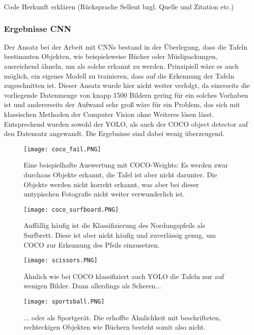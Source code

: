 Code Herkunft erklären (Rücksprache Sellent bzgl. Quelle und Zitation etc.)\\

\subsubsection{Ergebnisse CNN}

Der Ansatz bei der Arbeit mit CNNs bestand in der Überlegung, dass die Tafeln bestimmten Objekten, wie beispielsweise Bücher oder Müslipackungen, ausreichend ähneln, um als solche erkannt zu werden. Prinzipiell wäre es auch möglich, ein eigenes Modell zu trainieren, dass auf die Erkennung der Tafeln zugeschnitten ist. Dieser Ansatz wurde hier nicht weiter verfolgt, da einerseits die vorliegende Datenmenge von knapp 1500 Bildern gering für ein solches Vorhaben ist und andererseits der Aufwand sehr groß wäre für ein Problem, das sich mit klassischen Methoden der Computer Vision ohne Weiteres lösen lässt.\\
Entsprechend wurden sowohl der YOLO, als auch der COCO object detector auf den Datensatz angewandt. Die Ergebnisse sind dabei wenig überzeugend.

\begin{SCfigure}[1][h!]
\caption{Eine beispielhafte Auswertung mit COCO-Weights: Es werden zwar durchaus Objekte erkannt, die Tafel ist aber nicht darunter. Die Objekte werden nicht korrekt erkannt, was aber bei dieser untypischen Fotografie nicht weiter verwunderlich ist.}
\texttt{[image: coco\_fail.PNG]}
\end{SCfigure}

\begin{SCfigure}[1][h!]
\caption{Auffällig häufig ist die Klassifizierung des Nordungspfeils als Surfbrett. Diese ist aber nicht häufig und zuverlässig genug, um COCO zur Erkennung des Pfeils einzusetzen.}
\texttt{[image: coco\_surfboard.PNG]}
\end{SCfigure}

\begin{SCfigure}[1][h!]
\caption{Ähnlich wie bei COCO klassifiziert auch YOLO die Tafeln nur auf wenigen Bilder. Dann allerdings als Scheren...}
\texttt{[image: scissors.PNG]}
\end{SCfigure}

\begin{SCfigure}[1][h!]
\caption{... oder als Sportgerät. Die erhoffte Ähnlichkeit mit beschrifteten, rechteckigen Objekten wie Büchern besteht somit also nicht.}
\texttt{[image: sportsball.PNG]}
\end{SCfigure}

